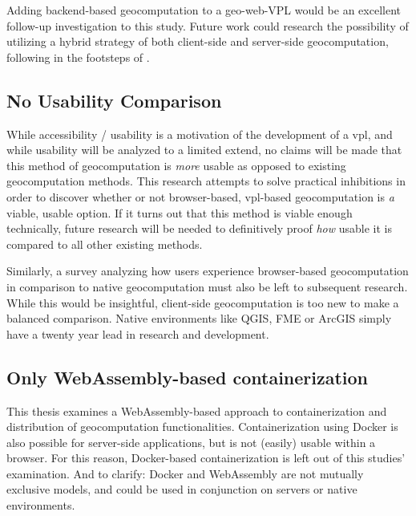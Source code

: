 Adding backend-based geocomputation to a geo-web-VPL would be an excellent follow-up investigation to this study. 
Future work could research the possibility of utilizing a hybrid strategy of both client-side and server-side geocomputation, following in the footsteps of \cite{panidi_hybrid_2015}. 

\subsection*{No Usability Comparison} %
While accessibility / usability is a motivation of the development of a \ac{vpl}, and while usability will be analyzed to a limited extend, no claims will be made that this method of geocomputation is \emph{more} usable as opposed to existing geocomputation methods. This research attempts to solve practical inhibitions in order to discover whether or not browser-based, vpl-based geocomputation is \emph{a} viable, usable option. If it turns out that this method is viable enough technically, future research will be needed to definitively proof \emph{how} usable it is compared to all other existing methods.  


Similarly, a survey analyzing how users experience browser-based geocomputation in comparison to native geocomputation must also be left to subsequent research. While this would be insightful, client-side geocomputation is too new to make a balanced comparison. Native environments like QGIS, FME or ArcGIS simply have a twenty year lead in research and development. 




\subsection*{Only WebAssembly-based containerization}
This thesis examines a WebAssembly-based approach to containerization and distribution of geocomputation functionalities. 
Containerization using Docker is also possible for server-side applications, but is not (easily) usable within a browser. 
For this reason, Docker-based containerization is left out of this studies' examination. 
And to clarify: Docker and WebAssembly are not mutually exclusive models, and could be used in conjunction on servers or native environments. 

